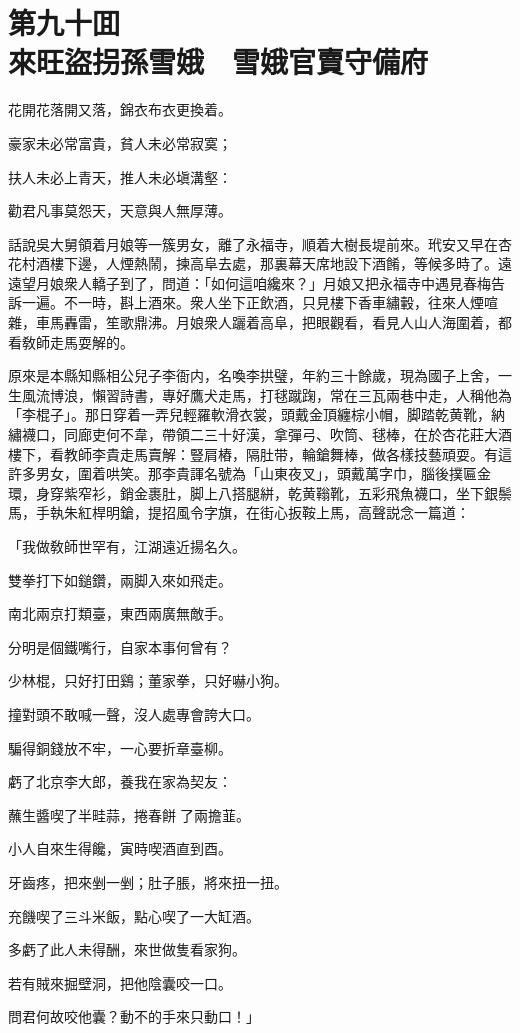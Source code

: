 
\chapter*{第九十囬　\\來旺盜拐孫雪娥　雪娥官賣守備府}


\begin{myquote}
花開花落開又落，錦衣布衣更換着。

豪家未必常富貴，貧人未必常寂寞；

扶人未必上青天，推人未必塡溝壑：

勸君凡事莫怨天，天意與人無厚薄。
\end{myquote}

話說吳大舅領着月娘等一簇男女，離了永福寺，順着大樹長堤前來。玳安又早在杏花村酒樓下邊，人煙熱鬧，揀高阜去處，那裏幕天席地設下酒餚，等候多時了。遠遠望月娘衆人轎子到了，問道：「如何這咱纔來？」月娘又把永福寺中遇見春梅告訴一遍。不一時，斟上酒來。衆人坐下正飲酒，只見樓下香車繡轂，往來人煙喧雜，車馬轟雷，笙歌鼎沸。月娘衆人躧着高阜，把眼觀看，看見人山人海圍着，都看敎師走馬耍解的。

原來是本縣知縣相公兒子李衙内，名喚李拱璧，年約三十餘歲，現為國子上舍，一生風流博浪，懶習詩書，專好鷹犬走馬，打毬蹴踘，常在三瓦兩巷中走，人稱他為「李棍子」。那日穿着一弄兒輕羅軟滑衣裳，頭戴金頂纏棕小帽，脚踏乾黄靴，納繡襪口，同廊吏何不韋，帶領二三十好漢，拿彈弓、吹筒、毬棒，在於杏花莊大酒樓下，看教師李貴走馬賣解：豎肩樁，隔肚带，輪鎗舞棒，做各樣技藝頑耍。有這許多男女，圍着哄笑。那李貴諢名號為「山東夜叉」，頭戴萬字巾，腦後撲匾金環，身穿紫窄衫，銷金裹肚，脚上八搭腿絣，乾黄䩺靴，五彩飛魚襪口，坐下銀鬃馬，手執朱紅桿明鎗，提招風令字旗，在街心扳鞍上馬，高聲説念一篇道：

\begin{myquote}
「我做敎師世罕有，江湖遠近揚名久。

雙拳打下如鎚鑽，兩脚入來如飛走。

南北兩京打類臺，東西兩廣無敵手。

分明是個鐵嘴行，自家本事何曾有？

少林棍，只好打田鷄；董家拳，只好嚇小狗。

撞對頭不敢喊一聲，沒人處專會誇大口。

騙得銅錢放不牢，一心要折章臺柳。

虧了北京李大郎，養我在家為契友：

蘸生醬喫了半畦蒜，捲春餅𠳹了兩擔韮。

小人自來生得饞，寅時喫酒直到酉。

牙齒疼，把來剉一剉；肚子脹，將來扭一扭。

充饑喫了三斗米飯，點心喫了一大缸酒。

多虧了此人未得酬，來世做隻看家狗。

若有賊來掘壁洞，把他陰囊咬一口。

問君何故咬他囊？動不的手來只動口！」
\end{myquote}

